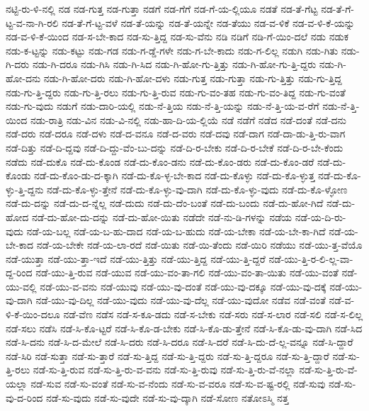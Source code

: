 {ನಟ್ಟಿ-ರು-ಳಿ-ನಲ್ಲಿ
ನಡ
ನಡ-ಗುತ್ತ
ನಡ-ಗುತ್ತಾ
ನಡಗೆ
ನಡ-ಗೆಗೆ
ನಡ-ಗೆ-ಯ-ಲ್ಲಿಯೂ
ನಡತೆ
ನಡ-ತೆ-ಗೆಟ್ಟ
ನಡ-ತೆ-ಗೆ-ಟ್ಟ-ವ-ನಾ-ಗಿ-ರಲಿ
ನಡ-ತೆ-ಗೆ-ಟ್ಟ-ವಳೆ
ನಡ-ತೆ-ಯನ್ನು
ನಡ-ತೆ-ಯನ್ನೇ
ನಡ-ತೆಯು
ನಡ-ವ-ಳಿಕೆ
ನಡ-ವ-ಳಿ-ಕೆ-ಯನ್ನು
ನಡ-ವ-ಳಿ-ಕೆ-ಯಿಂದ
ನಡ-ಸ-ಬೇ-ಕಾದ
ನಡ-ಸು-ತ್ತಿದ್ದ
ನಡ-ಸು-ವೆನು
ನಡಿ
ನಡಿಗೆ
ನಡಿ-ಗೆ-ಯಿಂ-ದಲೆ
ನಡು
ನಡುಕ
ನಡು-ಕ-ಟ್ಟನ್ನು
ನಡು-ಕಟ್ಟು
ನಡು-ಗಡ
ನಡು-ಗ-ಡ್ಡೆ-ಗಳೇ
ನಡು-ಗ-ಬೇ-ಕಾದು
ನಡು-ಗ-ಲಿಲ್ಲ
ನಡುಗಿ
ನಡು-ಗಿತು
ನಡು-ಗಿ-ದರು
ನಡು-ಗಿ-ದರೂ
ನಡು-ಗಿಸಿ
ನಡು-ಗಿ-ಸಿದ
ನಡು-ಗಿ-ಹೋ-ಗು-ತ್ತಿತ್ತು
ನಡು-ಗಿ-ಹೋ-ಗು-ತ್ತಿ-ದ್ದರು
ನಡು-ಗಿ-ಹೋ-ದನು
ನಡು-ಗಿ-ಹೋ-ದರು
ನಡು-ಗಿ-ಹೋ-ದಳು
ನಡು-ಗುತ್ತ
ನಡು-ಗುತ್ತಾ
ನಡು-ಗು-ತ್ತಿತ್ತು
ನಡು-ಗು-ತ್ತಿದ್ದ
ನಡು-ಗು-ತ್ತಿ-ದ್ದರು
ನಡು-ಗು-ತ್ತಿ-ರಲು
ನಡು-ಗು-ತ್ತಿ-ರುವ
ನಡು-ಗು-ವಂ-ತಹ
ನಡು-ಗು-ವಂ-ತಿದ್ದ
ನಡು-ಗು-ವಂತೆ
ನಡು-ಗು-ವುದು
ನಡುಗೆ
ನಡು-ದಾರಿ-ಯಲ್ಲಿ
ನಡು-ನೆ-ತ್ತಿಯ
ನಡು-ನೆ-ತ್ತಿ-ಯನ್ನು
ನಡು-ನೆ-ತ್ತಿ-ಯ-ವ-ರೆಗೆ
ನಡು-ನೆ-ತ್ತಿ-ಯಿಂದ
ನಡು-ರಾತ್ರಿ
ನಡು-ವಿನ
ನಡು-ವಿ-ನಲ್ಲಿ
ನಡು-ಹಾ-ದಿ-ಯ-ಲ್ಲಿಯೆ
ನಡೆ
ನಡೆಗೆ
ನಡೆದ
ನಡೆ-ದಂತೆ
ನಡೆ-ದನು
ನಡೆ-ದರು
ನಡೆ-ದರೂ
ನಡೆ-ದಳು
ನಡೆ-ದ-ವನೂ
ನಡೆ-ದ-ವರು
ನಡೆ-ದವು
ನಡೆ-ದಾಗ
ನಡೆ-ದಾ-ಡು-ತ್ತಿ-ರು-ವಾಗ
ನಡೆ-ದಿತ್ತು
ನಡೆ-ದಿ-ದ್ದವು
ನಡೆ-ದಿ-ದ್ದು-ವೆಂ-ಬು-ದನ್ನು
ನಡೆ-ದಿ-ರ-ಬೇಕು
ನಡೆ-ದಿ-ರ-ಬೇಕೆ
ನಡೆ-ದಿ-ರ-ಬೇ-ಕೆಂದು
ನಡೆದು
ನಡೆ-ದುಕೊ
ನಡೆ-ದು-ಕೊಂಡ
ನಡೆ-ದು-ಕೊಂ-ಡನು
ನಡೆ-ದು-ಕೊಂ-ಡರು
ನಡೆ-ದು-ಕೊಂ-ಡರೆ
ನಡೆ-ದು-ಕೊಂಡು
ನಡೆ-ದು-ಕೊಂ-ಡು-ದ-ಕ್ಕಾಗಿ
ನಡೆ-ದು-ಕೊ-ಳ್ಳ-ಬೇ-ಕಾದ
ನಡೆ-ದು-ಕೊಳ್ಳು
ನಡೆ-ದು-ಕೊ-ಳ್ಳುತ್ತ
ನಡೆ-ದು-ಕೊ-ಳ್ಳು-ತ್ತಿ-ದ್ದನು
ನಡೆ-ದು-ಕೊ-ಳ್ಳು-ತ್ತೇನೆ
ನಡೆ-ದು-ಕೊ-ಳ್ಳು-ವು-ದಾಗಿ
ನಡೆ-ದು-ಕೊ-ಳ್ಳು-ವುದು
ನಡೆ-ದು-ಕೊ-ಳ್ಳೋಣ
ನಡೆ-ದು-ದನ್ನು
ನಡೆ-ದು-ದ-ನ್ನೆಲ್ಲ
ನಡೆ-ದುದು
ನಡೆ-ದು-ದೆಂ-ಬಂತೆ
ನಡೆ-ದು-ಬಂದು
ನಡೆ-ದು-ಹೋ-ಗಿದೆ
ನಡೆ-ದು-ಹೋದ
ನಡೆ-ದು-ಹೋ-ದು-ದನ್ನು
ನಡೆ-ದು-ಹೋ-ಯಿತು
ನಡೆದೇ
ನಡೆ-ನು-ಡಿ-ಗಳನ್ನು
ನಡೆಯ
ನಡೆ-ಯ-ದಿ-ರು-ವುದು
ನಡೆ-ಯ-ಬಲ್ಲ
ನಡೆ-ಯ-ಬ-ಹು-ದಾದ
ನಡೆ-ಯ-ಬ-ಹುದು
ನಡೆ-ಯ-ಬೇಕಾ
ನಡೆ-ಯ-ಬೇ-ಕಾ-ಗಿದೆ
ನಡೆ-ಯ-ಬೇ-ಕಾದ
ನಡೆ-ಯ-ಬೇಕೇ
ನಡೆ-ಯ-ಲಾ-ರದೆ
ನಡೆ-ಯಿತು
ನಡೆ-ಯಿ-ತೆಂದು
ನಡೆ-ಯಿರಿ
ನಡೆಯು
ನಡೆ-ಯು-ತ್ತ-ವೆಯೊ
ನಡೆ-ಯುತ್ತಾ
ನಡೆ-ಯು-ತ್ತಾ-ಇದೆ
ನಡೆ-ಯು-ತ್ತಿತ್ತು
ನಡೆ-ಯು-ತ್ತಿದ್ದ
ನಡೆ-ಯು-ತ್ತಿ-ದ್ದರೆ
ನಡೆ-ಯು-ತ್ತಿ-ರ-ಲಿ-ಲ್ಲ-ವಾ-ದ್ದ-ರಿಂದ
ನಡೆ-ಯು-ತ್ತಿ-ರುವ
ನಡೆ-ಯುವ
ನಡೆ-ಯು-ವಂ-ತಾ-ಗಲಿ
ನಡೆ-ಯು-ವಂ-ತಾ-ಯಿತು
ನಡೆ-ಯು-ವಂತೆ
ನಡೆ-ಯು-ವಲ್ಲಿ
ನಡೆ-ಯು-ವ-ವನು
ನಡೆ-ಯುವು
ನಡೆ-ಯು-ವು-ದಂತೆ
ನಡೆ-ಯು-ವು-ದಕ್ಕೂ
ನಡೆ-ಯು-ವು-ದಕ್ಕೆ
ನಡೆ-ಯು-ವು-ದಾಗಿ
ನಡೆ-ಯು-ವು-ದಿಲ್ಲ
ನಡೆ-ಯು-ವುದು
ನಡೆ-ಯು-ವು-ದೆಲ್ಲ
ನಡೆ-ಯು-ವುದೋ
ನಡೆವ
ನಡೆ-ವಂತೆ
ನಡೆ-ವ-ಳಿ-ಕೆ-ಯಿಂ-ದಲೂ
ನಡೆ-ವೆಣ
ನಡೆಸ
ನಡೆ-ಸ-ಕೂ-ಡದು
ನಡೆ-ಸ-ಬೇಕು
ನಡೆ-ಸರು
ನಡೆ-ಸ-ಲಾರ
ನಡೆ-ಸಲಿ
ನಡೆ-ಸ-ಲಿಲ್ಲ
ನಡೆ-ಸಲು
ನಡೆಸಿ
ನಡೆ-ಸಿ-ಕೊ-ಟ್ಟರೆ
ನಡೆ-ಸಿ-ಕೊ-ಡ-ಬೇಕು
ನಡೆ-ಸಿ-ಕೊ-ಡು-ತ್ತೇನೆ
ನಡೆ-ಸಿ-ಕೊ-ಡು-ವು-ದಾಗಿ
ನಡೆ-ಸಿದ
ನಡೆ-ಸಿ-ದನು
ನಡೆ-ಸಿ-ದ-ಮೇಲೆ
ನಡೆ-ಸಿ-ದರು
ನಡೆ-ಸಿ-ದರೂ
ನಡೆ-ಸಿ-ದರೆ
ನಡೆ-ಸಿ-ದು-ದೆ-ಲ್ಲ-ವನ್ನೂ
ನಡೆ-ಸಿ-ದ್ದಾರೆ
ನಡೆ-ಸಿರಿ
ನಡೆ-ಸುತ್ತಾ
ನಡೆ-ಸು-ತ್ತಾರೆ
ನಡೆ-ಸು-ತ್ತಿದ್ದ
ನಡೆ-ಸು-ತ್ತಿ-ದ್ದರು
ನಡೆ-ಸು-ತ್ತಿ-ದ್ದರೂ
ನಡೆ-ಸು-ತ್ತಿ-ದ್ದಾರೆ
ನಡೆ-ಸು-ತ್ತಿ-ರಲು
ನಡೆ-ಸು-ತ್ತಿ-ರುವ
ನಡೆ-ಸು-ತ್ತಿ-ರು-ವ-ವನು
ನಡೆ-ಸು-ತ್ತಿ-ರುವು
ನಡೆ-ಸು-ತ್ತಿ-ರು-ವೆ-ನಲ್ಲಾ
ನಡೆ-ಸು-ತ್ತಿ-ರು-ವೆ-ಯಲ್ಲಾ
ನಡೆ-ಸುವ
ನಡೆ-ಸು-ವಂತೆ
ನಡೆ-ಸು-ವ-ನೆಂದು
ನಡೆ-ಸು-ವ-ವರೂ
ನಡೆ-ಸು-ವ-ಷ್ಟ-ರಲ್ಲಿ
ನಡೆ-ಸುವು
ನಡೆ-ಸು-ವು-ದ-ರಿಂದ
ನಡೆ-ಸು-ವುದು
ನಡೆ-ಸು-ವುದೇ
ನಡೆ-ಸು-ವು-ದ್ಕಾಗಿ
ನಡೆ-ಸೋಣ
ನತೋಽಸ್ಮಿ
ನತ್ತ
}
